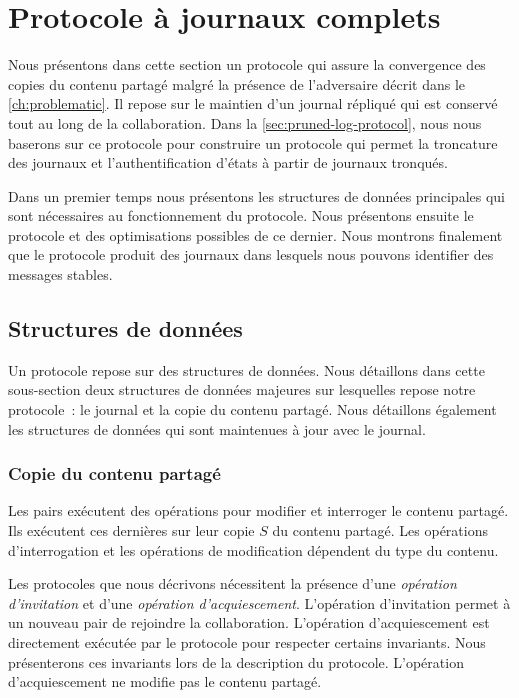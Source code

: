 \clearpage

\section{Protocole à journaux complets}\label{sec:full-log-protocol}

Nous présentons dans cette section un protocole qui assure la convergence des copies du contenu partagé malgré la présence de l'adversaire décrit dans le \autoref{ch:problematic}.
Il repose sur le maintien d'un journal répliqué qui est conservé tout au long de la collaboration.
Dans la \autoref{sec:pruned-log-protocol}, nous nous baserons sur ce protocole pour construire un protocole qui permet la troncature des journaux et l'authentification d'états à partir de journaux tronqués.

Dans un premier temps nous présentons les structures de données principales qui sont nécessaires au fonctionnement du protocole.
Nous présentons ensuite le protocole et des optimisations possibles de ce dernier.
Nous montrons finalement que le protocole produit des journaux dans lesquels nous pouvons identifier des messages stables.


\subsection{Structures de données}\label{subsec:full-log-data-structures}

Un protocole repose sur des structures de données.
Nous détaillons dans cette sous-section deux structures de données majeures sur lesquelles repose notre protocole~: le journal et la copie du contenu partagé.
Nous détaillons également les structures de données qui sont maintenues à jour avec le journal.

\subsubsection{Copie du contenu partagé}

Les pairs exécutent des opérations pour modifier et interroger le contenu partagé.
Ils exécutent ces dernières sur leur copie $S$ du contenu partagé.
Les opérations d'interrogation et les opérations de modification dépendent du type du contenu.

Les protocoles que nous décrivons nécessitent la présence d'une \emph{opération d'invitation} et d'une \emph{opération d'acquiescement}.
L'opération d'invitation permet à un nouveau pair de rejoindre la collaboration.
L'opération d'acquiescement est directement exécutée par le protocole pour respecter certains invariants. 
Nous présenterons ces invariants lors de la description du protocole.
L'opération d'acquiescement ne modifie pas le contenu partagé.

